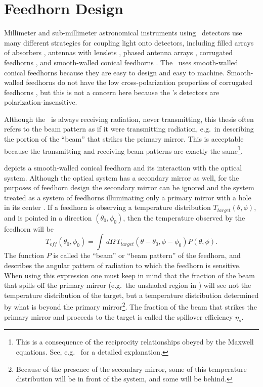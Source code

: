 
\section{Feedhorn Design}\label{sec:ch4-feedhorn-design}

Millimeter and sub-millimeter astronomical instruments using \TES\ detectors use many different strategies for coupling light onto detectors, including filled arrays of absorbers \cite{swetz_overview_2011,holland_scuba-2:_2013}, antennas with lenslets \cite{keating_ultra_2011}, phased antenna arrays \cite{obrient_antenna-coupled_2012}, corrugated feedhorns \cite{austermann_sptpol:_2012,niemack_actpol:_2010}, and smooth-walled conical feedhorns \cite{schwan_invited_2011,carlstrom_10_2011}.
The \Imager\ uses smooth-walled conical feedhorns because they are easy to design and easy to machine.
Smooth-walled feedhorns do not have the low cross-polarization properties of corrugated feedhorns \cite{clarricoats_corrugated_1984}, but this is not a concern here because the \Imager's detectors are polarization-insensitive.

Although the \Imager\ is always receiving radiation, never transmitting, this thesis often refers to the beam pattern as if it were transmitting radiation, e.g.\ in describing the portion of the ``beam'' that strikes the primary mirror.
This is acceptable because the transmitting and receiving beam patterns are exactly the same\footnote{This is a consequence of the reciprocity relationships obeyed by the Maxwell equations. See, e.g.\ \cite{balanis_antenna_2005} for a detailed explanation.}.

 depicts a smooth-walled conical feedhorn and its interaction with the optical system.
Although the optical system has a secondary mirror as well, for the purposes of feedhorn design the secondary mirror can be ignored and the system treated as a system of feedhorns illuminating only a primary mirror with a hole in its center \cite{goldsmith_quasioptical_1998}.
If a feedhorn is observing a temperature distribution $T_{target}(\theta,\phi)$, and is pointed in a direction $(\theta_0, \phi_0)$, then the temperature observed by the feedhorn will be
\begin{equation}
    T_{eff}(\theta_0,\phi_0) = \int \, d \Omega \, T_{target}(\theta - \theta_0,\phi - \phi_0) P(\theta,\phi).
\end{equation}
The function $P$ is called the ``beam'' or ``beam pattern'' of the feedhorn, and describes the angular pattern of radiation to which the feedhorn is sensitive.
When using this expression one must keep in mind that the fraction of the beam that spills off the primary mirror (e.g.\ the unshaded region in ) will see not the temperature distribution of the target, but a temperature distribution determined by what is beyond the primary mirror\footnote{Because of the presence of the secondary mirror, some of this temperature distribution will be in front of the system, and some will be behind.}.
The fraction of the beam that strikes the primary mirror and proceeds to the target is called the spillover efficiency $\eta_s$.

